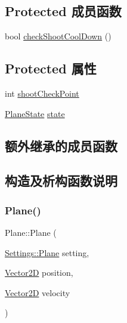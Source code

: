 \subsection*{Protected 成员函数}
\begin{DoxyCompactItemize}
\item 
bool \hyperlink{class_plane_a77bd3df33921e215669be6583619ee45}{check\+Shoot\+Cool\+Down} ()
\end{DoxyCompactItemize}
\subsection*{Protected 属性}
\begin{DoxyCompactItemize}
\item 
int \hyperlink{class_plane_a36cb09c56fbf7b8c28506d8dd70f07cb}{shoot\+Check\+Point}
\item 
\hyperlink{_plane_01-_01_bullet_8h_a9f852e2715e13ec145d551659d2813bc}{Plane\+State} \hyperlink{class_plane_a30babe177abbe22e61d2cc274945f3fc}{state}
\end{DoxyCompactItemize}
\subsection*{额外继承的成员函数}


\subsection{构造及析构函数说明}
\mbox{\label{class_plane_ab0729538ddb380ca9a5b501f4cf72714}} 
\subsubsection{\texorpdfstring{Plane()}{Plane()}}
{\footnotesize\ttfamily Plane\+::\+Plane (\begin{DoxyParamCaption}\item[{\hyperlink{struct_settings_1_1_plane}{Settings\+::\+Plane}}]{setting,  }\item[{\hyperlink{_vector2_d_8hpp_aa1f1145650f1dd9bddf7335ec6434d7c}{Vector2D}}]{position,  }\item[{\hyperlink{_vector2_d_8hpp_aa1f1145650f1dd9bddf7335ec6434d7c}{Vector2D}}]{velocity }\end{DoxyParamCaption})}

\mbox{\label{class_plane_a69abd86051c880dcb44b249ad10c4436}} 
